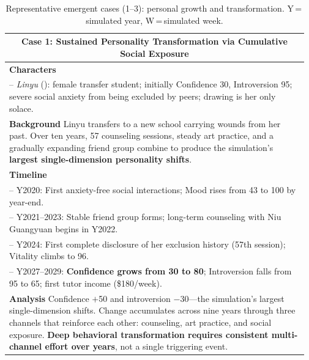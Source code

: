\begin{table}[htbp]
\centering\small
\caption{Representative emergent cases (1--3): personal growth and transformation. Y\,=\,simulated year, W\,=\,simulated week.}
\label{tab:cases_1_3}
\begin{tabular}{p{0.97\linewidth}}
\toprule

\multicolumn{1}{c}{\textbf{Case 1: Sustained Personality Transformation via Cumulative Social Exposure}}\\
\midrule
\textbf{Characters}\\
\quad -- \textit{Linyu} (\campus{}): female transfer student;
  initially Confidence 30, Introversion 95;
  severe social anxiety from being excluded by peers; drawing is her only solace.\\[2pt]
\textbf{Background}\quad
Linyu transfers to a new school carrying wounds from her past.
Over ten years, 57 counseling sessions, steady art practice, and a gradually expanding
friend group combine to produce the simulation's \textbf{largest single-dimension personality shifts}.\\[2pt]
\textbf{Timeline}\\
\quad -- Y2020: First anxiety-free social interactions;
  Mood rises from 43 to 100 by year-end.\\
\quad -- Y2021--2023: Stable friend group forms;
  long-term counseling with Niu Guangyuan begins in Y2022.\\
\quad -- Y2024: First complete disclosure of her exclusion history (57th session);
  Vitality climbs to 96.\\
\quad -- Y2027--2029: \textbf{Confidence grows from 30 to 80};
  Introversion falls from 95 to 65;
  first tutor income (\$180/week).\\[2pt]
\textbf{Analysis}\quad
Confidence $+$50 and introversion $-$30---the simulation's largest single-dimension shifts.
Change accumulates across nine years through three channels that reinforce each other:
counseling, art practice, and social exposure.
\textbf{Deep behavioral transformation requires consistent multi-channel effort over years},
not a single triggering event.\\

\midrule


\end{tabular}
\end{table}
